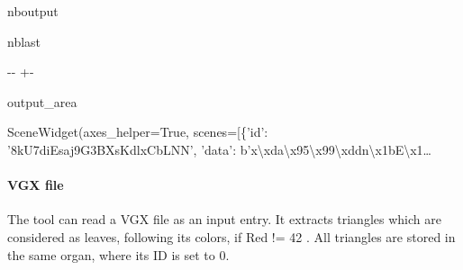 \documentclass[letterpaper,10pt,english]{sphinxmanual}
\begin{document}
\begin{sphinxuseclass}{nboutput}
\begin{sphinxuseclass}{nblast}
{

\kern-\sphinxverbatimsmallskipamount\kern-\baselineskip
\kern+\FrameHeightAdjust\kern-\fboxrule
\vspace{\nbsphinxcodecellspacing}

\begin{sphinxuseclass}{output_area}
\begin{sphinxuseclass}{}


\begin{sphinxVerbatim}[commandchars=\\\{\}]
\llap{\color{nbsphinxout}[8]:\,\hspace{\fboxrule}\hspace{\fboxsep}}SceneWidget(axes\_helper=True, scenes=[\{'id': '8kU7diEsaj9G3BXsKdlxCbLNN', 'data': b'x\textbackslash{}xda\textbackslash{}x95\textbackslash{}x99\textbackslash{}xddn\textbackslash{}x1bE\textbackslash{}x1…
\end{sphinxVerbatim}



\end{sphinxuseclass}
\end{sphinxuseclass}
}

\end{sphinxuseclass}
\end{sphinxuseclass}

\paragraph{VGX file}
\label{\detokenize{input_scenes:VGX-file}}
\sphinxAtStartPar
The tool can read a VGX file as an input entry. It extracts triangles which are considered as leaves, following its colors, if Red != 42 . All triangles are stored in the same organ, where its ID is set to 0.
\end{document}
